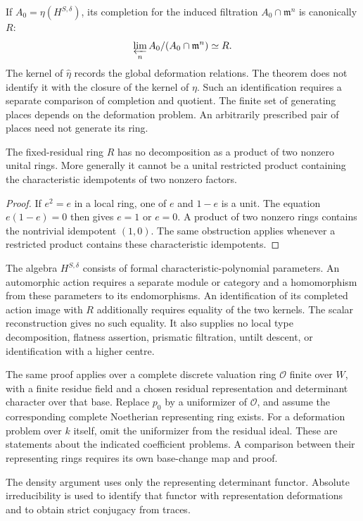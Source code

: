 \begin{remark}
\label{v4-arith:w10-e:global-relations}
If $A_0=\eta(H^{S,\delta})$, its completion for the induced filtration
$A_0\cap\mathfrak m^n$ is canonically $R$:
\[
 \varprojlim_n A_0/(A_0\cap\mathfrak m^n)\simeq R.
\]
The kernel of $\widehat\eta$ records the global deformation relations.
The theorem does not identify it with the closure of the kernel of
$\eta$. Such an identification requires a separate comparison of
completion and quotient. The finite set of generating places depends
on the deformation problem. An arbitrarily prescribed pair of places
need not generate its ring.
\end{remark}

\begin{proposition}
\label{v4-arith:w10-e:local-product-obstruction}
The fixed-residual ring $R$ has no decomposition as a product of two
nonzero unital rings. More generally it cannot be a unital restricted
product containing the characteristic idempotents of two nonzero
factors.
\end{proposition}

\begin{proof}
If $e^2=e$ in a local ring, one of $e$ and $1-e$ is a unit.
The equation $e(1-e)=0$ then gives $e=1$ or $e=0$.
A product of two nonzero rings contains the nontrivial idempotent
$(1,0)$. The same obstruction applies whenever a restricted product
contains these characteristic idempotents.
\end{proof}

The algebra $H^{S,\delta}$ consists of formal characteristic-polynomial
parameters. An automorphic action requires a separate module or
category and a homomorphism from these parameters to its endomorphisms.
An identification of its completed action image with $R$ additionally
requires equality of the two kernels. The scalar reconstruction gives
no such equality. It also supplies no local type decomposition,
flatness assertion, prismatic filtration, untilt descent, or
identification with a higher centre.


\begin{remark}
\label{v4-arith:w10-e:coefficient-variants}
The same proof applies over a complete discrete valuation ring
$\mathcal O$ finite over $W$, with a finite residue field and a chosen
residual representation and determinant character over that base.
Replace $p_0$ by a uniformizer of $\mathcal O$, and assume the
corresponding complete Noetherian representing ring exists.
For a deformation problem over $k$ itself, omit the uniformizer
from the residual ideal. These are statements about the indicated
coefficient problems. A comparison between their representing rings
requires its own base-change map and proof.

The density argument uses only the representing determinant functor.
Absolute irreducibility is used to identify that functor with
representation deformations and to obtain strict conjugacy from traces.
\end{remark}

